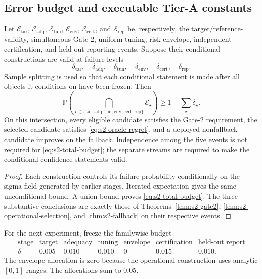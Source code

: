 \subsection{Error budget and executable Tier-A constants}
\label{subsec:stage2-budget}

\begin{proposition}
\label{prop:s2-error-budget}
Let \(\mathcal E_{\mathrm{tar}}\), \(\mathcal E_{\mathrm{adq}}\),
\(\mathcal E_{\mathrm{tun}}\), \(\mathcal E_{\mathrm{env}}\),
\(\mathcal E_{\mathrm{cert}}\), and \(\mathcal E_{\mathrm{rep}}\) be,
respectively, the target/reference-validity, simultaneous Gate-2, uniform
tuning, risk-envelope, independent certification, and held-out-reporting
events.  Suppose their conditional constructions are valid at
failure levels
\[
 \delta_{\mathrm{tar}},\quad
 \delta_{\mathrm{adq}},\quad
 \delta_{\mathrm{tun}},\quad
 \delta_{\mathrm{env}},\quad
 \delta_{\mathrm{cert}},\quad
 \delta_{\mathrm{rep}}.
\]
Sample splitting is used so that each conditional statement is made after all
objects it conditions on have been frozen.  Then
\begin{equation}
 \mathbb P\left(
  \bigcap_{\star\in\{\mathrm{tar,adq,tun,env,cert,rep}\}}
  \mathcal E_\star
 \right)
 \geq
 1-
 \sum_\star\delta_\star.
 \label{eq:s2-total-budget}
\end{equation}
On this intersection, every eligible candidate satisfies the Gate-2
requirement, the selected candidate satisfies
\eqref{eq:s2-oracle-regret}, and a deployed nonfallback candidate improves on
the fallback.  Independence among the five events is not required for
\eqref{eq:s2-total-budget}; the separate streams are required to make the
conditional confidence statements valid.
\end{proposition}

\begin{proof}
Each construction controls its failure probability conditionally on the
sigma-field generated by earlier stages.  Iterated expectation gives the same
unconditional bound.  A union bound proves \eqref{eq:s2-total-budget}.  The
three substantive conclusions are exactly those of
Theorems~\ref{thm:s2-gate2}, \ref{thm:s2-operational-selection}, and
\ref{thm:s2-fallback} on their respective events.
\end{proof}

For the next experiment, freeze the familywise budget
\begin{equation}
\begin{array}{c|cccccc}
\text{stage}
&\text{target}
&\text{adequacy}
&\text{tuning}
&\text{envelope}
&\text{certification}
&\text{held-out report}\\ \hline
\delta
&0.005&0.010&0.010&0&0.015&0.010 .
\end{array}
\label{eq:s2-numeric-budget}
\end{equation}
The envelope allocation is zero because the operational construction uses
analytic \([0,1]\) ranges.  The allocations sum to \(0.05\).


